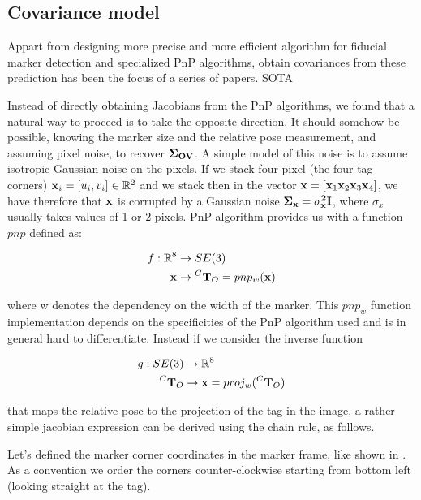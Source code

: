 \subsection{Covariance model}
Appart from designing more precise and more efficient algorithm for fiducial marker detection and specialized PnP algorithms,
 obtain covariances from these prediction has been the focus of a series of papers.
 SOTA

Instead of directly obtaining Jacobians from the PnP algorithms, we found that a natural way to proceed is to take the opposite 
direction. It should somehow be possible, knowing the marker size and the relative pose measurement, and assuming pixel noise, to
recover $\bf \Sigma_{OV}$. A simple model of this noise is to assume isotropic Gaussian noise on the pixels. If we stack four pixel (the four tag corners) 
${\bf x}_i = [u_i, v_i] \in \mathbb{R}^2$ and we stack then in the vector ${\bf x} = [{\bf x}_1 {\bf x}_2 {\bf x}_3 {\bf x}_4]$, we have therefore that
${\bf x}$ is corrupted by a Gaussian noise $\bf \Sigma_{{\bf x}} = \sigma_{x}^2 {\bf I}$, where $\sigma_{x}$ usually takes values of 1 or 2 pixels.
PnP algorithm provides us with a function $pnp$ defined as:

\begin{equation}
    \begin{split}
        f: \mathbb{R}^8 &\rightarrow SE(3) \\
                           {\bf x} &\rightarrow \prescript{C}{}{{\bf T}}_{O} = pnp_w({\bf x})
    \end{split}
\end{equation}

where w denotes the dependency on the width of the marker. This $pnp_w$ function implementation depends on the specificities of the PnP algorithm used and  
is in general hard to differentiate. Instead if we consider the inverse function

\begin{equation}
    \begin{split}
        g: SE(3) &\rightarrow \mathbb{R}^8 \\
                           \prescript{C}{}{{\bf T}}_{O} &\rightarrow {\bf x} = proj_w(\prescript{C}{}{{\bf T}}_{O})
    \end{split}
\end{equation}

that maps the relative pose to the projection of the tag in the image, a rather simple jacobian expression can be derived using the chain rule, as follows.

Let's defined the marker corner coordinates in the marker frame, like shown in \fig {}. As a convention 
\cite{wang2016iros} we order the corners counter-clockwise starting from bottom left (looking straight at the tag). 

